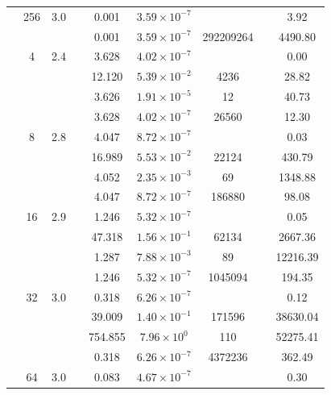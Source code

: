 \begin{table}[htbp]
\begin{tabular}{l S[table-format=3.0] S[table-format=4.1] l S[table-format=3.3] S[table-format=1.2e2] S[table-format=6.0] S[table-format=2.0] S[table-format=4.2]}
     & 256 & 3.0 &  & 0.001 & $3.59 \times 10^{-7}$ & {\text{---}} & {\text{---}} & 3.92 \\
     &  &  &  & 0.001 & $3.59 \times 10^{-7}$ & 292209264 & {\text{---}} & 4490.80 \\
    \midrule
     & 4 & 2.4 &  & 3.628 & $4.02 \times 10^{-7}$ & {\text{---}} & {\text{---}} & 0.00 \\
     &  &  &  & 12.120 & $5.39 \times 10^{-2}$ & 4236 & {\text{---}} & 28.82 \\
     &  &  &  & 3.626 & $1.91 \times 10^{-5}$ & 12 & {\text{---}} & 40.73 \\
     &  &  &  & 3.628 & $4.02 \times 10^{-7}$ & 26560 & {\text{---}} & 12.30 \\
     & 8 & 2.8 &  & 4.047 & $8.72 \times 10^{-7}$ & {\text{---}} & {\text{---}} & 0.03 \\
     &  &  &  & 16.989 & $5.53 \times 10^{-2}$ & 22124 & {\text{---}} & 430.79 \\
     &  &  &  & 4.052 & $2.35 \times 10^{-3}$ & 69 & {\text{---}} & 1348.88 \\
     &  &  &  & 4.047 & $8.72 \times 10^{-7}$ & 186880 & {\text{---}} & 98.08 \\
     & 16 & 2.9 &  & 1.246 & $5.32 \times 10^{-7}$ & {\text{---}} & {\text{---}} & 0.05 \\
     &  &  &  & 47.318 & $1.56 \times 10^{-1}$ & 62134 & {\text{---}} & 2667.36 \\
     &  &  &  & 1.287 & $7.88 \times 10^{-3}$ & 89 & {\text{---}} & 12216.39 \\
     &  &  &  & 1.246 & $5.32 \times 10^{-7}$ & 1045094 & {\text{---}} & 194.35 \\
     & 32 & 3.0 &  & 0.318 & $6.26 \times 10^{-7}$ & {\text{---}} & {\text{---}} & 0.12 \\
     &  &  &  & 39.009 & $1.40 \times 10^{-1}$ & 171596 & {\text{---}} & 38630.04 \\
     &  &  &  & 754.855 & $7.96 \times 10^{0}$ & 110 & {\text{---}} & 52275.41 \\
     &  &  &  & 0.318 & $6.26 \times 10^{-7}$ & 4372236 & {\text{---}} & 362.49 \\
     & 64 & 3.0 &  & 0.083 & $4.67 \times 10^{-7}$ & {\text{---}} & {\text{---}} & 0.30 \\

\end{tabular}
\end{table}
